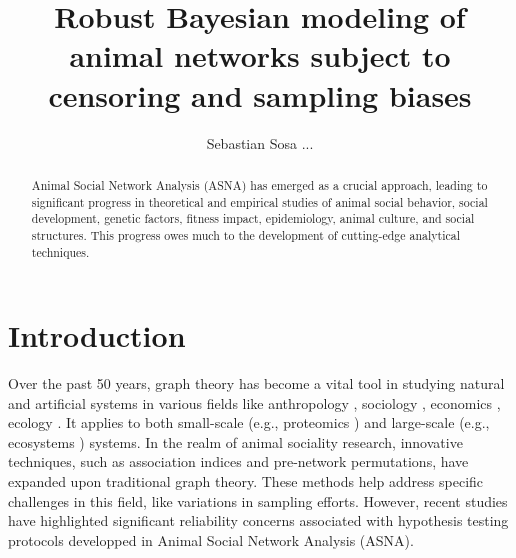 \documentclass[Afour,sageh,times]{sagej}
\begin{document}

\title{Robust Bayesian modeling of animal networks subject to censoring and sampling biases }

\author{Sebastian Sosa ... }





\begin{abstract}
Animal Social Network Analysis (ASNA) has emerged as a crucial approach, leading to significant progress in theoretical and empirical studies of animal social behavior, social development, genetic factors, fitness impact, epidemiology, animal culture, and social structures. This progress owes much to the development of cutting-edge analytical techniques.
\end{abstract}


\maketitle
\section{Introduction}
\linenumbers

Over the past 50 years, graph theory has become a vital tool in studying natural and artificial systems in various fields like anthropology \citep{apicella2012social}, sociology \citep{Milgram1967}, economics \citep{ter2009applying}, ecology \citep{sosa2021animal}. It applies to both small-scale (e.g., proteomics \citep{ravasz2002hierarchical}) and large-scale (e.g., ecosystems \citep{ulanowicz2014limits}) systems. In the realm of animal sociality research, innovative techniques, such as association indices and pre-network permutations\citep{Whitehead1999, Farine2013, Farine2015a}, have expanded upon traditional graph theory. These methods help address specific challenges in this field, like variations in sampling efforts. However, recent studies have highlighted significant reliability concerns associated with hypothesis testing protocols developped in Animal Social Network Analysis (ASNA)\citep{weiss2021common, Puga2021, Hart2022, Farine2022}. 
\end{document}
